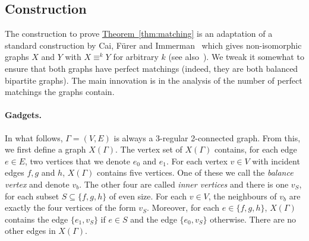 \documentclass[11pt]{article}
\newcommand{\expref}[2]{\texorpdfstring{\hyperref[#2]{#1~\ref{#2}}}{#1~\ref{#2}}}
\begin{document}
\subsection{Construction}\label{sec:construction}
The construction to prove \expref{Theorem}{thm:matching} is an adaptation of a
standard construction by Cai, F\"{u}rer and Immerman~\cite{CFI92} which gives
non-isomorphic graphs $X$ and $Y$ with $X \equiv^k Y$ for arbitrary $k$ (see
also~\cite{DR07}). We tweak it somewhat to ensure that both graphs have perfect
matchings (indeed, they are both balanced bipartite graphs). The main innovation
is in the analysis of the number of perfect matchings the graphs contain.
\paragraph{Gadgets.}
In what follows, $\Gamma = (V,E)$ is always a 3-regular 2-connected graph. From this,
we first define a graph $X(\Gamma)$. The vertex set of $X(\Gamma)$ contains, for each edge
$e \in E$, two vertices that we denote $e_0$ and $e_1$. For each vertex $v\in V$
with incident edges $f,g$ and $h$, $X(\Gamma)$ contains five vertices. One of these
we call the \emph{balance vertex} and denote $v_b$. The other four are called
\emph{inner vertices} and there is one $v_S$, for each subset $S \subseteq
\{f,g,h\}$ of even size. For each $v \in V$, the neighbours of $v_b$ are exactly
the four vertices of the form $v_S$. Moreover, for each $e \in \{f,g,h\}$,
$X(\Gamma)$ contains the edge $\{e_1,v_S\}$ if $e \in S$ and the edge $\{e_0,v_S\}$
otherwise. There are no other edges in $X(\Gamma)$.
\end{document}
